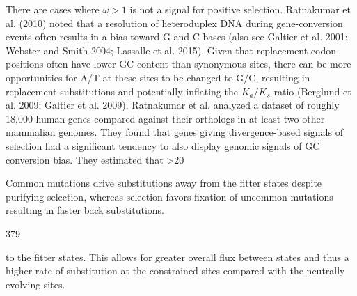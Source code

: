 \documentclass{article}
\begin{document}
There are cases where  $ \omega > 1 $ is not a signal for positive selection. Ratnakumar et al. (2010) noted that a resolution of heteroduplex DNA during gene-conversion events often results in a bias toward G and C bases (also see Galtier et al. 2001; Webster and Smith 2004; Lassalle et al. 2015). Given that replacement-codon positions often have lower GC content than synonymous sites, there can be more opportunities for A/T at these sites to be changed to G/C, resulting in replacement substitutions and potentially inflating the  $ K_{a}/K_{s} $ ratio (Berglund et al. 2009; Galtier et al. 2009). Ratnakumar et al. analyzed a dataset of roughly 18,000 human genes compared against their orthologs in at least two other mammalian genomes. They found that genes giving divergence-based signals of selection had a significant tendency to also display genomic signals of GC conversion bias. They estimated that >20%

Common mutations drive substitutions away from the fitter states despite purifying selection, whereas selection favors fixation of uncommon mutations resulting in faster back substitutions.

379

to the fitter states. This allows for greater overall flux between states and thus a higher rate of substitution at the constrained sites compared with the neutrally evolving sites.
\end{document}
